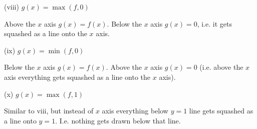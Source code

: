 \vs

(viii) $g(x)=\max(f,0)$

Above the $x$ axis $g(x)=f(x)$. Below the $x$ axis $g(x)=0$, i.e. it gets squashed as a line onto the $x$ axis.

\vs

(ix) $g(x)=\min(f,0)$

Below the $x$ axis $g(x)=f(x)$. Above the $x$ axis $g(x)=0$ (i.e. above the $x$ axis everything gets squashed as a line onto the $x$ axis).

\vs

(x) $g(x)=\max(f, 1)$

Similar to viii, but instead of $x$ axis everything below $y=1$ line gets squashed as a line onto $y=1$. I.e. nothing gets drawn below that line.

